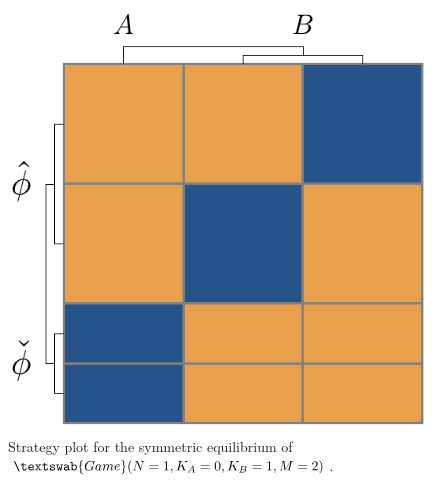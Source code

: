 \documentclass{beamer}
\theoremstyle{definition}
\newcommand{\G}[1]{$\textswab{Game}(#1)$}
\begin{document}
\begin{frame}{}

\begin{figure}[H]
    \centering
    \includegraphics[width=6 cm]{img/StrategyPlot_1012.pdf}
    \caption{\small \centering Strategy plot for the symmetric equilibrium of \G{N=1,K_A=0,K_B=1,M=2}.}
    \label{fig:StrategyPlot_1012}
\end{figure}

\end{frame}
\end{document}
